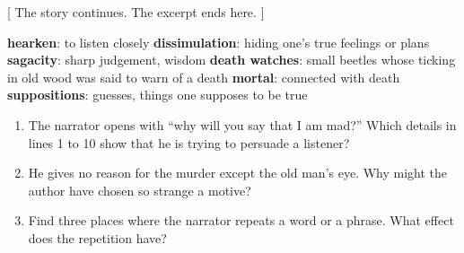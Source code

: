 \documentclass[11pt,a4paper]{article}
\begin{document}
\vspace{0.6em}
\begin{center}\sffamily\small\color{anthology}[ The story continues. The excerpt ends here. ]\end{center}

\vspace{0.4em}
\begin{tcolorbox}[colback=white, colframe=anthology, boxrule=0.5pt, left=8pt, right=8pt, top=5pt, bottom=5pt,
  arc=0pt, title={\sffamily\bfseries Glossary}, fonttitle=\sffamily\small, coltitle=white, colbacktitle=anthology]
\sffamily\small
\textbf{hearken}: to listen closely \quad \textbf{dissimulation}: hiding one's true feelings or plans \quad
\textbf{sagacity}: sharp judgement, wisdom \quad \textbf{death watches}: small beetles whose ticking in old wood
was said to warn of a death \quad \textbf{mortal}: connected with death \quad \textbf{suppositions}: guesses, things
one supposes to be true
\end{tcolorbox}

\vspace{0.6em}
\begin{tcolorbox}[colback=anthology!6, colframe=anthology, boxrule=0.5pt, left=8pt, right=8pt, top=5pt, bottom=5pt,
  arc=0pt, title={\sffamily\bfseries Think about it}, fonttitle=\sffamily\small, coltitle=white, colbacktitle=anthology]
\sffamily\small
\begin{enumerate}[leftmargin=1.5em, itemsep=0.2em, label=\textbf{\arabic*.}]
  \item The narrator opens with ``why will you say that I am mad?'' Which details in lines 1 to 10 show that he is
        trying to persuade a listener?
  \item He gives no reason for the murder except the old man's eye. Why might the author have chosen so strange a
        motive?
  \item Find three places where the narrator repeats a word or a phrase. What effect does the repetition have?
\end{enumerate}
\end{tcolorbox}
\end{document}
